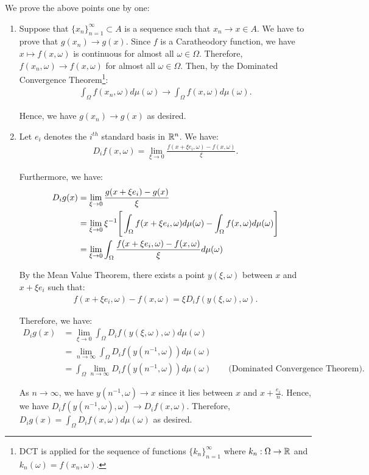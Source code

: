 \begin{proof*}
	We prove the above points one by one:
	\begin{enumerate}[label=(\roman*)]
		\item Suppose that $\{x_n\}_{n=1}^\infty\subset A$ is a sequence such that $x_n\to x\in A$. We have to prove that $g(x_n)\to g(x)$. Since $f$ is a Caratheodory function, we have $x\mapsto f(x, \omega)$ is continuous for almost all $\omega\in\Omega$. Therefore, $f(x_n,\omega)\to f(x, \omega)$ for almost all $\omega\in\Omega$. Then, by the Dominated Convergence Theorem\footnote{DCT is applied for the sequence of functions $\{k_n\}_{n=1}^\infty$ where $k_n:\Omega\to\mathbb{R}$ and $k_n(\omega)=f(x_n, \omega)$.}:
		\begin{align*}
			\int_\Omega f(x_n, \omega) d\mu(\omega) \to \int_\Omega f(x, \omega)d\mu(\omega).	
		\end{align*} 

		\noindent Hence, we have $g(x_n) \to g(x)$ as desired.

		\item Let $e_i$ denotes the $i^{th}$ standard basis in $\mathbb{R}^n$. We have:
		\begin{align*}
			D_i f(x, \omega) = \lim_{\xi\to 0} \frac{f(x+\xi e_i, \omega) - f(x, \omega)}{\xi}.
		\end{align*} 

		\noindent Furthermore, we have:
		\begin{align*}
			D_i g(x) &= \lim_{\xi\to0}\frac{g(x+\xi e_i) - g(x)}{\xi} \\
				&= \lim_{\xi\to0}\xi^{-1}\Bigg[ 
					\int_\Omega f(x+\xi e_i, \omega)d\mu(\omega) - \int_\Omega f(x, \omega)d\mu(\omega) 
				 \Bigg] \\
				&= \lim_{\xi\to0}\int_\Omega \frac{f(x+\xi e_i, \omega) - f(x, \omega)}{\xi}d\mu(\omega)
		\end{align*} 

		\noindent By the Mean Value Theorem, there exists a point $y(\xi, \omega)$ between $x$ and $x+\xi e_i$ such that:
		\begin{align*}
			f(x+\xi e_i, \omega) - f(x, \omega) = \xi D_i f(y(\xi, \omega), \omega).
		\end{align*} 

		\noindent Therefore, we have:
		\begin{align*}
			D_ig(x) &= \lim_{\xi\to0}\int_\Omega D_i f(y(\xi, \omega), \omega)d\mu(\omega) \\
				&= \lim_{n\to\infty} \int_\Omega D_i f(y(n^{-1}, \omega))d\mu(\omega) \\
				&= \int_\Omega \lim_{n\to\infty} D_if(y(n^{-1}, \omega))d\mu(\omega) \qquad \text{(Dominated Convergence Theorem)}.
		\end{align*} 

		\noindent As $n\to\infty$, we have $y(n^{-1}, \omega)\to x$ since it lies between $x$ and $x+\frac{e_i}{n}$. Hence, we have $D_if(y(n^{-1}, \omega), \omega) \to D_i f(x, \omega)$. Therefore, $D_ig(x) = \int_\Omega D_i f(x, \omega)d\mu(\omega)$ as desired.
	\end{enumerate} 	
\end{proof*} 
